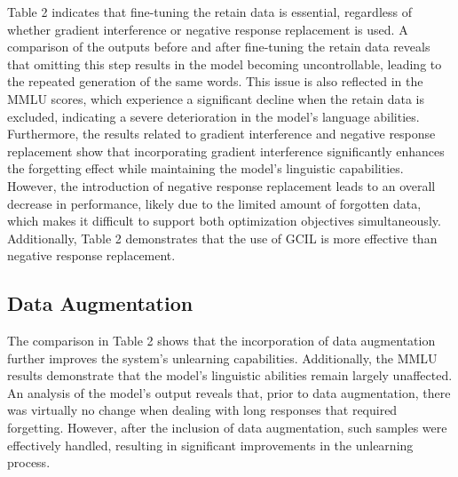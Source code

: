 \documentclass[11pt]{article}
\begin{document}

Table 2 indicates that fine-tuning the retain data is essential, regardless of whether gradient interference or negative response replacement is used. A comparison of the outputs before and after fine-tuning the retain data reveals that omitting this step results in the model becoming uncontrollable, leading to the repeated generation of the same words. This issue is also reflected in the MMLU scores, which experience a significant decline when the retain data is excluded, indicating a severe deterioration in the model's language abilities. Furthermore, the results related to gradient interference and negative response replacement show that incorporating gradient interference significantly enhances the forgetting effect while maintaining the model's linguistic capabilities. However, the introduction of negative response replacement leads to an overall decrease in performance, likely due to the limited amount of forgotten data, which makes it difficult to support both optimization objectives simultaneously. Additionally, Table 2 demonstrates that the use of GCIL is more effective than negative response replacement.

\subsection{Data Augmentation} 

The comparison in Table 2 shows that the incorporation of data augmentation further improves the system's unlearning capabilities. Additionally, the MMLU results demonstrate that the model’s linguistic abilities remain largely unaffected. An analysis of the model's output reveals that, prior to data augmentation, there was virtually no change when dealing with long responses that required forgetting. However, after the inclusion of data augmentation, such samples were effectively handled, resulting in significant improvements in the unlearning process.
\end{document}
